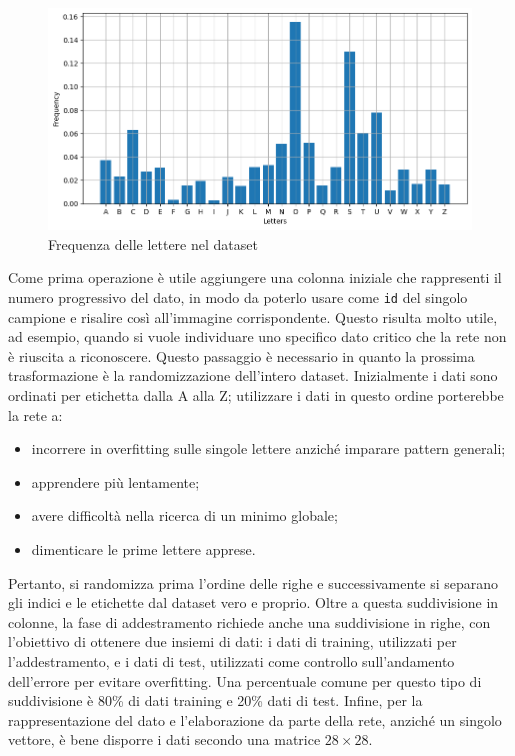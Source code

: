 \documentclass[a4paper,12pt]{article}
\begin{document}
\begin{figure}
    \centering
    \includegraphics[width=1\linewidth]{images/letters_frequency.png}
    \caption{Frequenza delle lettere nel dataset}
    \label{letters_frequency}
\end{figure}

Come prima operazione è utile aggiungere una colonna iniziale che rappresenti il numero progressivo del dato, in modo da poterlo usare come \texttt{id} del singolo campione e risalire così all'immagine corrispondente. Questo risulta molto utile, ad esempio, quando si vuole individuare uno specifico dato critico che la rete non è riuscita a riconoscere. Questo passaggio è necessario in quanto la prossima trasformazione è la randomizzazione dell'intero dataset. Inizialmente i dati sono ordinati per etichetta dalla A alla Z; utilizzare i dati in questo ordine porterebbe la rete a:
\begin{itemize}
    \item incorrere in overfitting sulle singole lettere anziché imparare pattern generali;
    \item apprendere più lentamente;
    \item avere difficoltà nella ricerca di un minimo globale;
    \item dimenticare le prime lettere apprese.
\end{itemize}
Pertanto, si randomizza prima l'ordine delle righe e successivamente si separano gli indici e le etichette dal dataset vero e proprio.
Oltre a questa suddivisione in colonne, la fase di addestramento richiede anche una suddivisione in righe, con l'obiettivo di ottenere due insiemi di dati: i dati di training, utilizzati per l'addestramento, e i dati di test, utilizzati come controllo sull'andamento dell'errore per evitare overfitting. Una percentuale comune per questo tipo di suddivisione è 80\% di dati training e 20\% dati di test.
Infine, per la rappresentazione del dato e l'elaborazione da parte della rete, anziché un singolo vettore, è bene disporre i dati secondo una matrice $28\times28$.
\end{document}
